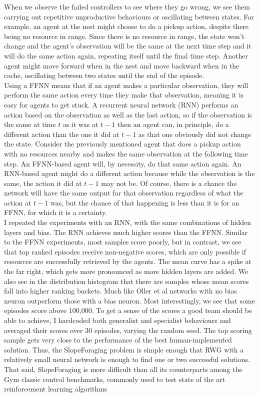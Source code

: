 \documentclass[12pt]{article}
\begin{document}
When we observe the failed controllers to see where they go wrong, we see them carrying out repetitive unproductive behaviours or oscillating between states.
For example, an agent at the nest might choose to do a pickup action, despite there being no resource in range.
Since there is no resource in range, the state won't change and the agent's observation will be the same at the next time step and it will do the same action again, repeating itself until the final time step.
Another agent might move forward when in the nest and move backward when in the cache, oscillating between two states until the end of the episode.\\

Using a FFNN means that if an agent makes a particular observation, they will perform the same action every time they make that observation, meaning it is easy for agents to get stuck.
A recurrent neural network (RNN) performs an action based on the observation as well as the last action, so if the observation is the same at time $t$ as it was at $t-1$ then an agent can, in principle, do a different action than the one it did at $t-1$ as that one obviously did not change the state.
Consider the previously mentioned agent that does a pickup action with no resources nearby and makes the same observation at the following time step.
An FFNN-based agent will, by necessity, do that same action again.
An RNN-based agent might do a different action because while the observation is the same, the action it did at $t-1$ may not be.
Of course, there is a chance the network will have the same output for that observation regardless of what the action at $t-1$ was, but the chance of that happening is less than it is for an FFNN, for which it is a certainty.\\

I repeated the experiments with an RNN, with the same combinations of hidden layers and bias.
The RNN achieves much higher scores than the FFNN.
Similar to the FFNN experiments, most samples score poorly, but in contrast, we see that top ranked episodes receive non-negative scores, which are only possible if resources are successfully retrieved by the agents.
The mean curve has a spike at the far right, which gets more pronounced as more hidden layers are added.
We also see in the distribution histogram that there are samples whose mean scores fall into higher ranking buckets.
Much like Oller et al \cite{oller:AAMAS:2020} networks with no bias neuron outperform those with a bias neuron.
Most interestingly, we see that some episodes score above 100,000.
To get a sense of the scores a good team should be able to achieve, I hardcoded both generalist and specialist behaviours and averaged their scores over 30 episodes, varying the random seed.
The top scoring sample gets very close to the performance of the best human-implemented solution.
Thus, the SlopeForaging problem is simple enough that RWG with a relatively small neural network is enough to find one or two successful solutions.
That said, SlopeForaging is more difficult than all its counterparts among the Gym classic control benchmarks, commonly used to test state of the art reinforcement learning algorithms \cite{oller:AAMAS:2020}\\
\end{document}
